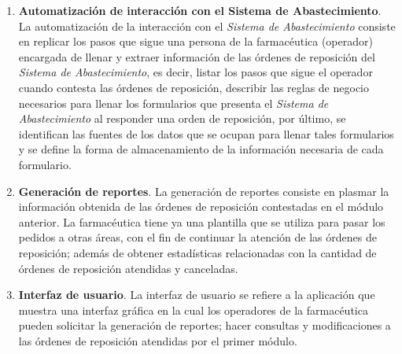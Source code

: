\begin{enumerate}
\item \textbf{Automatización de interacción con el Sistema de Abastecimiento}. La automatización de la interacción con el \textit{Sistema de Abastecimiento} consiste en replicar los pasos que sigue una persona de la farmacéutica (operador) encargada de llenar y extraer información de las órdenes de reposición del \textit{Sistema de Abastecimiento}, es decir, listar los pasos que sigue el operador cuando contesta las órdenes de reposición, describir las reglas de negocio necesarios para llenar los formularios que presenta el \textit{Sistema de Abastecimiento} al responder una orden de reposición, por último, se identifican las fuentes de los datos que se ocupan para llenar tales formularios y se define la forma de almacenamiento de la información necesaria de cada formulario.
\item \textbf{Generación de reportes}. La generación de reportes consiste en plasmar la información obtenida de las órdenes de reposición contestadas en el módulo anterior. La farmacéutica tiene ya una plantilla que se utiliza para pasar los pedidos a otras áreas, con el fin de continuar la atención de las órdenes de reposición; además de obtener estadísticas relacionadas con la cantidad de órdenes de reposición atendidas y canceladas.
\item \textbf{Interfaz de usuario}. La interfaz de usuario se refiere a la aplicación que muestra una interfaz gráfica en la cual los operadores de la farmacéutica pueden solicitar la generación de reportes; hacer consultas y modificaciones a las órdenes de reposición atendidas por el primer módulo.
\end{enumerate}

